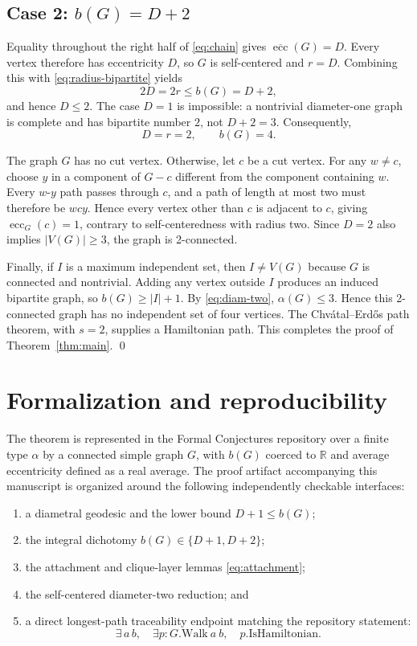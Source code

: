 \documentclass[10pt]{article}
\theoremstyle{paperplain}
\newcommand{\ecc}{\operatorname{ecc}}
\begin{document}
\subsection*{Case 2: \(b(G)=D+2\)}

Equality throughout the right half of \eqref{eq:chain} gives
\(\overline{\ecc}(G)=D\).  Every vertex therefore has eccentricity
\(D\), so \(G\) is self-centered and \(r=D\).  Combining this with
\eqref{eq:radius-bipartite} yields
\[
                         2D=2r\leq b(G)=D+2,
\]
and hence \(D\leq2\).  The case \(D=1\) is impossible: a nontrivial
diameter-one graph is complete and has bipartite number \(2\), not
\(D+2=3\).  Consequently,
\begin{equation}
                         D=r=2,\qquad b(G)=4.
\label{eq:diam-two}
\end{equation}

The graph \(G\) has no cut vertex.  Otherwise, let \(c\) be a cut
vertex.  For any \(w\ne c\), choose \(y\) in a component of \(G-c\)
different from the component containing \(w\).  Every \(w\)-\(y\)
path passes through \(c\), and a path of length at most two must
therefore be \(wcy\).  Hence every vertex other than \(c\) is adjacent
to \(c\), giving \(\ecc_G(c)=1\), contrary to self-centeredness with
radius two.  Since \(D=2\) also implies \(|V(G)|\geq3\), the graph is
2-connected.

Finally, if \(I\) is a maximum independent set, then \(I\neq V(G)\)
because \(G\) is connected and nontrivial.
Adding any vertex outside \(I\) produces an induced bipartite graph,
so \(b(G)\geq |I|+1\).  By \eqref{eq:diam-two},
\(\alpha(G)\leq3\).  Hence this 2-connected graph has no independent
set of four vertices.  The Chv\'atal--Erd\H{o}s path theorem, with
\(s=2\), supplies a Hamiltonian path.  This completes the proof of
Theorem~\ref{thm:main}. \qed

\section{Formalization and reproducibility}

The theorem is represented in the Formal Conjectures repository over
a finite type \(\alpha\) by a connected simple graph \(G\), with
\(b(G)\) coerced to \(\mathbb{R}\) and average eccentricity defined as
a real average.  The proof artifact accompanying this manuscript is
organized around the following independently checkable interfaces:
\begin{enumerate}[leftmargin=2.1em,itemsep=2pt]
  \item a diametral geodesic and the lower bound \(D+1\leq b(G)\);
  \item the integral dichotomy \(b(G)\in\{D+1,D+2\}\);
  \item the attachment and clique-layer lemmas
        \eqref{eq:attachment};
  \item the self-centered diameter-two reduction; and
  \item a direct longest-path traceability endpoint matching the repository
        statement:
        \[
          \exists\,a\,b,\quad
          \exists p:G.\mathrm{Walk}\ a\ b,\quad
          p.\mathrm{IsHamiltonian}.
        \]
\end{enumerate}
\end{document}

